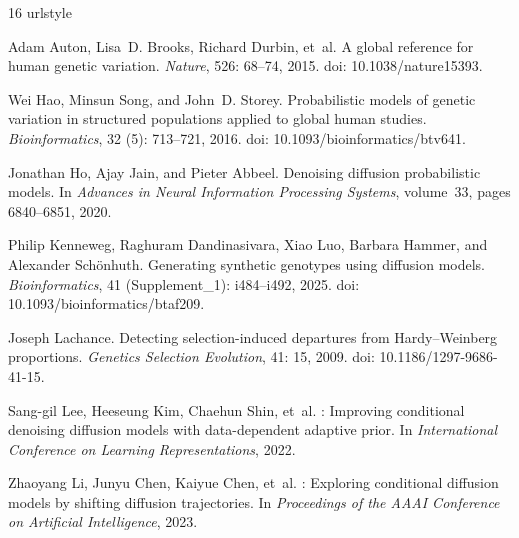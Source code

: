 \documentclass[11pt,a4paper]{article}
\begin{document}
\clearpage
\begingroup
\small
{}
\setlength{\bibsep}{3pt}
\begin{thebibliography}{16}
\providecommand{\natexlab}[1]{#1}
\providecommand{\url}[1]{\texttt{#1}}
\expandafter\ifx\csname urlstyle\endcsname\relax
  \providecommand{\doi}[1]{doi: #1}\else
  \providecommand{\doi}{doi: \begingroup \urlstyle{rm}\Url}\fi

Adam Auton, Lisa~D. Brooks, Richard Durbin, et~al.
\newblock A global reference for human genetic variation.
\newblock \emph{Nature}, 526: 68--74, 2015.
\newblock \doi{10.1038/nature15393}.

Wei Hao, Minsun Song, and John~D. Storey.
\newblock Probabilistic models of genetic variation in structured populations
  applied to global human studies.
\newblock \emph{Bioinformatics}, 32 (5): 713--721, 2016.
\newblock \doi{10.1093/bioinformatics/btv641}.

Jonathan Ho, Ajay Jain, and Pieter Abbeel.
\newblock Denoising diffusion probabilistic models.
\newblock In \emph{Advances in Neural Information Processing Systems},
  volume~33, pages 6840--6851, 2020.

Philip Kenneweg, Raghuram Dandinasivara, Xiao Luo, Barbara Hammer, and
  Alexander Sch{\"o}nhuth.
\newblock Generating synthetic genotypes using diffusion models.
\newblock \emph{Bioinformatics}, 41 (Supplement\_1):
  i484--i492, 2025.
\newblock \doi{10.1093/bioinformatics/btaf209}.

Joseph Lachance.
\newblock Detecting selection-induced departures from {Hardy--Weinberg}
  proportions.
\newblock \emph{Genetics Selection Evolution}, 41: 15, 2009.
\newblock \doi{10.1186/1297-9686-41-15}.

Sang-gil Lee, Heeseung Kim, Chaehun Shin, et~al.
: Improving conditional denoising diffusion models with
  data-dependent adaptive prior.
\newblock In \emph{International Conference on Learning Representations}, 2022.

Zhaoyang Li, Junyu Chen, Kaiyue Chen, et~al.
: Exploring conditional diffusion models by shifting
  diffusion trajectories.
\newblock In \emph{Proceedings of the AAAI Conference on Artificial
  Intelligence}, 2023.


\end{thebibliography}
\end{document}
